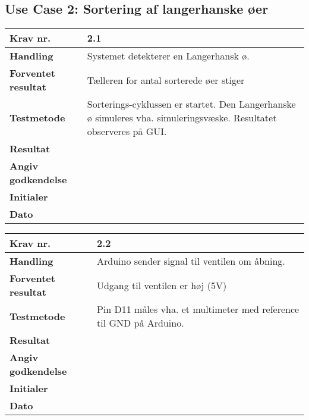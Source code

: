  \subsection{Use Case 2: Sortering af langerhanske øer}

	\begin{center}
		\begin{longtable}{ | m{4cm}| m{8.5cm}|} 
			\hline
			\textbf{Krav nr.} & 2.1  \\ 
			\hline
			\textbf{Handling} & Systemet detekterer en Langerhansk ø.  \\
			\hline
			\textbf{Forventet resultat} & Tælleren for antal sorterede øer stiger \\
			\hline
			\textbf{Testmetode}  & Sorterings-cyklussen er startet. Den Langerhanske ø simuleres vha. simuleringsvæske. Resultatet observeres på GUI.   \\
			\hline
			\textbf{Resultat}  &    \\
			\hline
			\textbf{Angiv godkendelse} &     \\
			\hline
			\textbf{Initialer} &     \\
			\hline
			\textbf{Dato} &    \\
			\hline
		\end{longtable}
	\end{center}	
	
	\begin{center}
		\begin{longtable}{ | m{4cm}| m{8.5cm}|} 
			\hline
			\textbf{Krav nr.} & 2.2  \\ 
			\hline
			\textbf{Handling} & Arduino sender signal til ventilen om åbning.  \\
			\hline
			\textbf{Forventet resultat} & Udgang til ventilen er høj (5V) \\
			\hline
			\textbf{Testmetode}  & Pin D11 måles vha. et multimeter med reference til GND på Arduino.  \\
			\hline
			\textbf{Resultat}  &    \\
			\hline
			\textbf{Angiv godkendelse} &     \\
			\hline
			\textbf{Initialer} &     \\
			\hline
			\textbf{Dato} &    \\
			\hline
		\end{longtable}
	\end{center}	
	
